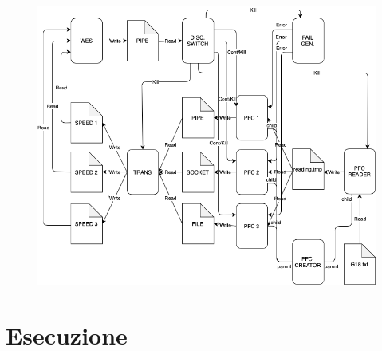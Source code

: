 \documentclass[11pt, oneside]{article}   	%
\begin{document}
\newpage
\begin{figure}[h!]
	\centering
	\includegraphics[scale=0.5]{schema.png}
\end{figure}
    
\section{Esecuzione}
\end{document}
